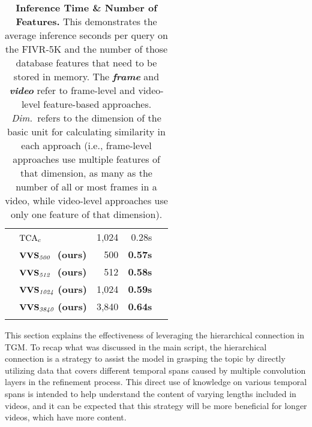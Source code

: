 \documentclass[10pt,twocolumn,letterpaper]{article}
\begin{document}
\begin{table}[!t]
\begin{center}
\begin{tabular}{@{}clrrc@{}}
             & $\textup{TCA}_{c}$~\cite{shao2021temporal}  & 1,024 & 0.28s\;\;\;\;\, & \\ \cmidrule(lr){2-4}
             & $\textbf{\textup{VVS}}_{\textit{500}}$ \,\,\textbf{(ours)} & 500 & \textbf{0.57s}\;\;\;\;\, &  \\
             & $\textbf{\textup{VVS}}_{\textit{512}}$ \,\,\textbf{(ours)} & 512 & \textbf{0.58s}\;\;\;\;\, & \\
             & $\textbf{\textup{VVS}}_{\textit{1024}}$ \textbf{(ours)} & 1,024 & \textbf{0.59s}\;\;\;\;\, & \\
             & $\textbf{\textup{VVS}}_{\textit{3840}}$ \textbf{(ours)} & 3,840 & \textbf{0.64s}\;\;\;\;\, &  \\
            \cmidrule[\heavyrulewidth]{1-5}
            \morecmidrules
            \cmidrule[\heavyrulewidth]{1-5} 
            \end{tabular}
            \vspace{-0mm}
            \caption{\textbf{Inference Time \& Number of Features.} This demonstrates the average inference seconds per query on the FIVR-5K and the number of those database features that need to be stored in memory. The \textit{\textbf{frame}} and \textit{\textbf{video}} refer to frame-level and video-level feature-based approaches. \textit{Dim.}~refers to the dimension of the basic unit for calculating similarity in each approach (i.e., frame-level approaches use multiple features of that dimension, as many as the number of all or most frames in a video, while video-level approaches use only one feature of that dimension). \vspace{0mm}} \label{tab:speed_mem}
        \end{center}
    \end{table}
    

        This section explains the effectiveness of leveraging the hierarchical connection in TGM. To recap what was discussed in the main script, the hierarchical connection is a strategy to assist the model in grasping the topic by directly utilizing data that covers different temporal spans caused by multiple convolution layers in the refinement process. This direct use of knowledge on various temporal spans is intended to help understand the content of varying lengths included in videos, and it can be expected that this strategy will be more beneficial for longer videos, which have more content.
\end{document}

